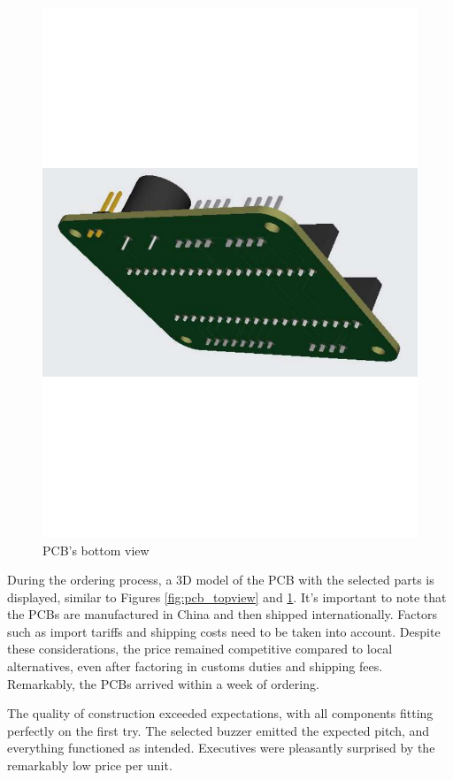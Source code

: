 \begin{figure}[h]
\begin{minipage}[b]{0.45\textwidth}
        \includegraphics[width=.9\textwidth]{Imagenes/Vectorial/pcb2.pdf}
        \caption{PCB's bottom view}
        \label{fig:pcb_bottomview}
    \end{minipage}
\end{figure}

During the ordering process, a 3D model of the PCB with the selected parts is displayed, similar to Figures 
\ref{fig:pcb_topview} and \ref{fig:pcb_bottomview}. It's important to note that the PCBs are manufactured in 
China and then shipped internationally. Factors such as import tariffs and shipping costs need to be taken 
into account. Despite these considerations, the price remained competitive compared to local alternatives, 
even after factoring in customs duties and shipping fees. Remarkably, the PCBs arrived within a week of 
ordering.

The quality of construction exceeded expectations, with all components fitting perfectly on the first try. 
The selected buzzer emitted the expected pitch, and everything functioned as intended. Executives were 
pleasantly surprised by the remarkably low price per unit.
